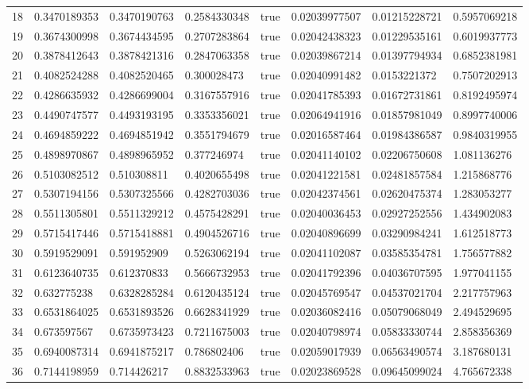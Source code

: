 \begin{tabular}{@{}llllllll@{}}
18 & 0.3470189353 & 0.3470190763 & 0.2584330348 & true & 0.02039977507 & 0.01215228721 & 0.5957069218 \\
19 & 0.3674300998 & 0.3674434595 & 0.2707283864 & true & 0.02042438323 & 0.01229535161 & 0.6019937773 \\
20 & 0.3878412643 & 0.3878421316 & 0.2847063358 & true & 0.02039867214 & 0.01397794934 & 0.6852381981 \\
21 & 0.4082524288 & 0.4082520465 & 0.300028473 & true & 0.02040991482 & 0.0153221372 & 0.7507202913 \\
22 & 0.4286635932 & 0.4286699004 & 0.3167557916 & true & 0.02041785393 & 0.01672731861 & 0.8192495974 \\
23 & 0.4490747577 & 0.4493193195 & 0.3353356021 & true & 0.02064941916 & 0.01857981049 & 0.8997740006 \\
24 & 0.4694859222 & 0.4694851942 & 0.3551794679 & true & 0.02016587464 & 0.01984386587 & 0.9840319955 \\
25 & 0.4898970867 & 0.4898965952 & 0.377246974 & true & 0.02041140102 & 0.02206750608 & 1.081136276 \\
26 & 0.5103082512 & 0.510308811 & 0.4020655498 & true & 0.02041221581 & 0.02481857584 & 1.215868776 \\
27 & 0.5307194156 & 0.5307325566 & 0.4282703036 & true & 0.02042374561 & 0.02620475374 & 1.283053277 \\
28 & 0.5511305801 & 0.5511329212 & 0.4575428291 & true & 0.02040036453 & 0.02927252556 & 1.434902083 \\
29 & 0.5715417446 & 0.5715418881 & 0.4904526716 & true & 0.02040896699 & 0.03290984241 & 1.612518773 \\
30 & 0.5919529091 & 0.591952909 & 0.5263062194 & true & 0.02041102087 & 0.03585354781 & 1.756577882 \\
31 & 0.6123640735 & 0.612370833 & 0.5666732953 & true & 0.02041792396 & 0.04036707595 & 1.977041155 \\
32 & 0.632775238 & 0.6328285284 & 0.6120435124 & true & 0.02045769547 & 0.04537021704 & 2.217757963 \\
33 & 0.6531864025 & 0.6531893526 & 0.6628341929 & true & 0.02036082416 & 0.05079068049 & 2.494529695 \\
34 & 0.673597567 & 0.6735973423 & 0.7211675003 & true & 0.02040798974 & 0.05833330744 & 2.858356369 \\
35 & 0.6940087314 & 0.6941875217 & 0.786802406 & true & 0.02059017939 & 0.06563490574 & 3.187680131 \\
36 & 0.7144198959 & 0.714426217 & 0.8832533963 & true & 0.02023869528 & 0.09645099024 & 4.765672338 \\

\end{tabular}
